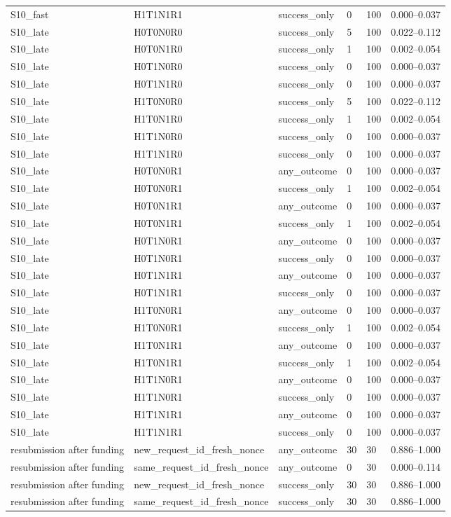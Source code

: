 \begin{table}[t]
\begin{tabular}{llllll}
S10\_fast & H1T1N1R1 & success\_only & 0 & 100 & 0.000–0.037 \\
S10\_late & H0T0N0R0 & success\_only & 5 & 100 & 0.022–0.112 \\
S10\_late & H0T0N1R0 & success\_only & 1 & 100 & 0.002–0.054 \\
S10\_late & H0T1N0R0 & success\_only & 0 & 100 & 0.000–0.037 \\
S10\_late & H0T1N1R0 & success\_only & 0 & 100 & 0.000–0.037 \\
S10\_late & H1T0N0R0 & success\_only & 5 & 100 & 0.022–0.112 \\
S10\_late & H1T0N1R0 & success\_only & 1 & 100 & 0.002–0.054 \\
S10\_late & H1T1N0R0 & success\_only & 0 & 100 & 0.000–0.037 \\
S10\_late & H1T1N1R0 & success\_only & 0 & 100 & 0.000–0.037 \\
S10\_late & H0T0N0R1 & any\_outcome & 0 & 100 & 0.000–0.037 \\
S10\_late & H0T0N0R1 & success\_only & 1 & 100 & 0.002–0.054 \\
S10\_late & H0T0N1R1 & any\_outcome & 0 & 100 & 0.000–0.037 \\
S10\_late & H0T0N1R1 & success\_only & 1 & 100 & 0.002–0.054 \\
S10\_late & H0T1N0R1 & any\_outcome & 0 & 100 & 0.000–0.037 \\
S10\_late & H0T1N0R1 & success\_only & 0 & 100 & 0.000–0.037 \\
S10\_late & H0T1N1R1 & any\_outcome & 0 & 100 & 0.000–0.037 \\
S10\_late & H0T1N1R1 & success\_only & 0 & 100 & 0.000–0.037 \\
S10\_late & H1T0N0R1 & any\_outcome & 0 & 100 & 0.000–0.037 \\
S10\_late & H1T0N0R1 & success\_only & 1 & 100 & 0.002–0.054 \\
S10\_late & H1T0N1R1 & any\_outcome & 0 & 100 & 0.000–0.037 \\
S10\_late & H1T0N1R1 & success\_only & 1 & 100 & 0.002–0.054 \\
S10\_late & H1T1N0R1 & any\_outcome & 0 & 100 & 0.000–0.037 \\
S10\_late & H1T1N0R1 & success\_only & 0 & 100 & 0.000–0.037 \\
S10\_late & H1T1N1R1 & any\_outcome & 0 & 100 & 0.000–0.037 \\
S10\_late & H1T1N1R1 & success\_only & 0 & 100 & 0.000–0.037 \\
resubmission after funding & new\_request\_id\_fresh\_nonce & any\_outcome & 30 & 30 & 0.886–1.000 \\
resubmission after funding & same\_request\_id\_fresh\_nonce & any\_outcome & 0 & 30 & 0.000–0.114 \\
resubmission after funding & new\_request\_id\_fresh\_nonce & success\_only & 30 & 30 & 0.886–1.000 \\
resubmission after funding & same\_request\_id\_fresh\_nonce & success\_only & 30 & 30 & 0.886–1.000 \\
\bottomrule
\end{tabular}
\end{table}
